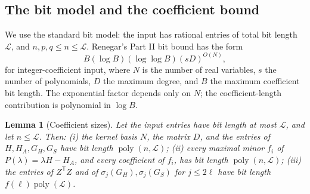 \documentclass[journal]{IEEEtran}
\theoremstyle{plainn}
\newtheorem{lem}[thm]{Lemma}
\theoremstyle{remark}
\begin{document}
\subsection{The bit model and the coefficient bound}\label{sec:bitsize}

We use the standard bit model: the input has rational entries of total bit
length $\mathcal L$, and $n,p,q\le n\le\mathcal L$. Renegar's Part II bit bound
\cite{ren92} has the form
\begin{equation}\label{eq:rengar}
B(\log B)(\log\log B)(sD)^{O(N)},
\end{equation}
for integer-coefficient input, where $N$ is the number of real variables, $s$
the number of polynomials, $D$ the maximum degree, and $B$ the maximum
coefficient bit length. The exponential factor depends only on $N$; the
coefficient-length contribution is polynomial in $\log B$.

\begin{lem}[Coefficient sizes]\label{lem:coeff}
Let the input entries have bit length at most $\mathcal L$, and let
$n\le\mathcal L$. Then:
\emph{(i)} the kernel basis $N$, the matrix $D$, and the entries of
$H,H_A,G_H,G_S$ have bit length $\operatorname{poly}(n,\mathcal L)$;
\emph{(ii)} every maximal minor $f_i$ of $P(\lambda)=\lambda H-H_A$, and every
coefficient of $f_i$, has bit length $\operatorname{poly}(n,\mathcal L)$;
\emph{(iii)} the entries of $Z^{\mathsf T}Z$ and of $\sigma_j(G_H),\sigma_j(G_S)$ for
$j\le2\ell$ have bit length $f(\ell)\operatorname{poly}(\mathcal L)$.
\end{lem}
\end{document}
